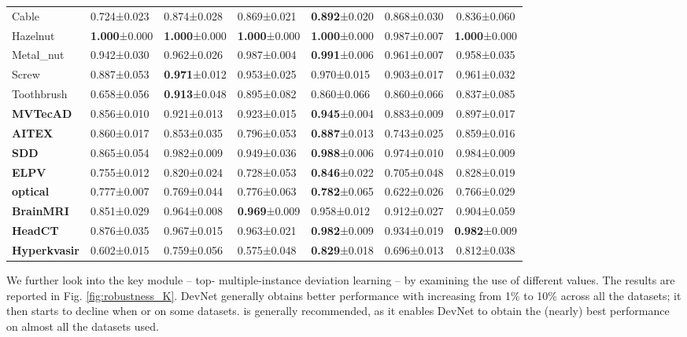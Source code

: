 \documentclass[10pt,journal,compsoc]{IEEEtran}
\begin{document}
\begin{table}[htbp]
{\begin{tabular}{p{1.35cm}p{1.2cm}p{1.2cm}p{1.25cm}p{1.3cm}|p{1.2cm}c}
    Cable & 0.724±0.023 & 0.874±0.028  & 0.869±0.021 & \textbf{0.892}±0.020 & 0.868±0.030 & 0.836±0.060 \\
    Hazelnut & \textbf{1.000}±0.000 & \textbf{1.000}±0.000 & \textbf{1.000}±0.000 & \textbf{1.000}±0.000 & 0.987±0.007 & \textbf{1.000}±0.000 \\
    Metal\_nut & 0.942±0.030 & 0.962±0.026  & 0.987±0.004 & \textbf{0.991}±0.006 & 0.961±0.007 & 0.958±0.035 \\
    Screw & 0.887±0.053 & \textbf{0.971}±0.012  & 0.953±0.025 & 0.970±0.015 & 0.903±0.017 & 0.961±0.032 \\
    Toothbrush & 0.658±0.056 & \textbf{0.913}±0.048  & 0.895±0.082 & 0.860±0.066 & 0.860±0.066 & 0.837±0.085 \\\hline
    \textbf{MVTecAD}& 0.856±0.010 & 0.921±0.013  & 0.923±0.015 & \textbf{0.945}±0.004 & 0.883±0.009 & 0.897±0.017 \\
    \textbf{AITEX} & 0.860±0.017 & 0.853±0.035  & 0.796±0.053 & \textbf{0.887}±0.013 & 0.743±0.025 & 0.859±0.016 \\
    \textbf{SDD}  & 0.865±0.054 & 0.982±0.009  & 0.949±0.036 & \textbf{0.988}±0.006 & 0.974±0.010 & 0.984±0.009 \\
    \textbf{ELPV} & 0.755±0.012 & 0.820±0.024  & 0.728±0.053 & \textbf{0.846}±0.022 & 0.705±0.048 & 0.828±0.019 \\
    \textbf{optical}  & 0.777±0.007 & 0.769±0.044 & 0.776±0.063 & \textbf{0.782}±0.065 & 0.622±0.026 & 0.766±0.029 \\
    \textbf{BrainMRI} & 0.851±0.029 & 0.964±0.008 & \textbf{0.969}±0.009 & 0.958±0.012 & 0.912±0.027 & 0.904±0.059 \\
    \textbf{HeadCT} & 0.876±0.035 & 0.967±0.015  & 0.963±0.021 & \textbf{0.982}±0.009 & 0.934±0.019 & \textbf{0.982}±0.009 \\
    \textbf{Hyperkvasir} & 0.602±0.015 & 0.759±0.056  & 0.575±0.048 & \textbf{0.829}±0.018 & 0.696±0.013 & 0.812±0.038 \\\hline
    \end{tabular}}
  \label{tab:ablation_image}\end{table}


We further look into the key module -- top- multiple-instance deviation learning -- by examining the use of different  values. The results are reported in Fig. \ref{fig:robustness_K}. DevNet generally obtains better performance with  increasing from 1\% to 10\% across all the datasets; it then starts to decline when  or  on some datasets.  is generally recommended, as it enables DevNet to obtain the (nearly) best performance on almost all the datasets used.
\end{document}
